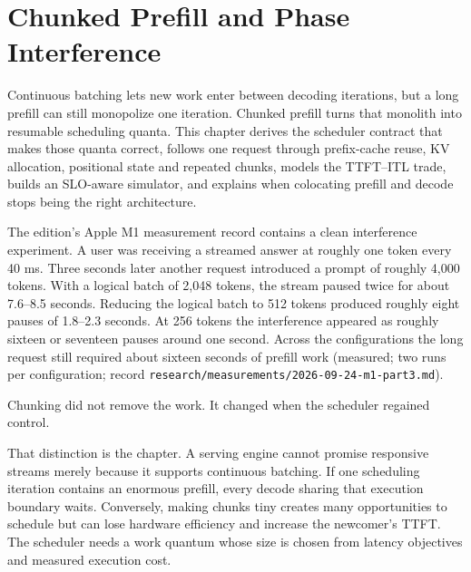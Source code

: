 \chapter{Chunked Prefill and Phase Interference}\label{ch:chunked-prefill}

\begin{ChapterIntent}
Continuous batching lets new work enter between decoding iterations, but a long prefill
can still monopolize one iteration. Chunked prefill turns that monolith into resumable
scheduling quanta. This chapter derives the scheduler contract that makes those quanta
correct, follows one request through prefix-cache reuse, KV allocation, positional
state and repeated chunks, models the TTFT--ITL trade, builds an SLO-aware simulator,
and explains when colocating prefill and decode stops being the right architecture.
\end{ChapterIntent}


The edition's Apple M1 measurement record contains a clean interference experiment.
A user was receiving a streamed answer at roughly one token every 40 ms. Three seconds
later another request introduced a prompt of roughly 4,000 tokens. With a logical
batch of 2,048 tokens, the stream paused twice for about 7.6--8.5 seconds. Reducing
the logical batch to 512 tokens produced roughly eight pauses of 1.8--2.3 seconds.
At 256 tokens the interference appeared as roughly sixteen or seventeen pauses around
one second. Across the configurations the long request still required about sixteen
seconds of prefill work (measured; two runs per configuration; record
\texttt{research/measurements/2026-09-24-m1-part3.md}).

Chunking did not remove the work. It changed when the scheduler regained control.

That distinction is the chapter. A serving engine cannot promise responsive streams
merely because it supports continuous batching. If one scheduling iteration contains
an enormous prefill, every decode sharing that execution boundary waits. Conversely,
making chunks tiny creates many opportunities to schedule but can lose hardware
efficiency and increase the newcomer's TTFT. The scheduler needs a work quantum whose
size is chosen from latency objectives and measured execution cost.


